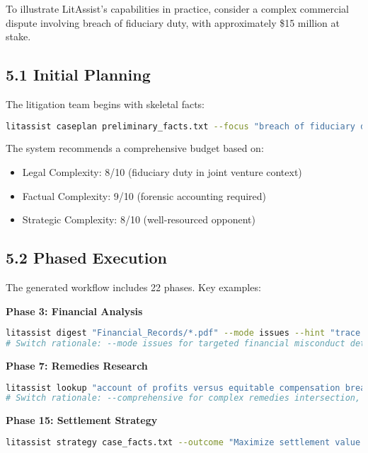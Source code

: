 \documentclass[12pt,a4paper]{article}
\begin{document}
To illustrate LitAssist's capabilities in practice, consider a complex commercial dispute involving breach of fiduciary duty, with approximately \$15 million at stake.

\subsection*{5.1 Initial Planning}

The litigation team begins with skeletal facts:

\begin{lstlisting}[language=bash]
litassist caseplan preliminary_facts.txt --focus "breach of fiduciary duty and remedies"
\end{lstlisting}

The system recommends a comprehensive budget based on:
\begin{itemize}
\item Legal Complexity: 8/10 (fiduciary duty in joint venture context)
\item Factual Complexity: 9/10 (forensic accounting required)
\item Strategic Complexity: 8/10 (well-resourced opponent)
\end{itemize}

\subsection*{5.2 Phased Execution}

The generated workflow includes 22 phases. Key examples:

\textbf{Phase 3: Financial Analysis}
\begin{lstlisting}[language=bash]
litassist digest "Financial_Records/*.pdf" --mode issues --hint "trace diverted funds and identify self-dealing transactions"
# Switch rationale: --mode issues for targeted financial misconduct detection
\end{lstlisting}

\textbf{Phase 7: Remedies Research}
\begin{lstlisting}[language=bash]
litassist lookup "account of profits versus equitable compensation breach fiduciary duty corporate context" --mode irac --comprehensive
# Switch rationale: --comprehensive for complex remedies intersection, --mode irac for structured analysis
\end{lstlisting}

\textbf{Phase 15: Settlement Strategy}
\begin{lstlisting}[language=bash]
litassist strategy case_facts.txt --outcome "Maximize settlement value through demonstrable litigation readiness"
\end{lstlisting}
\end{document}
